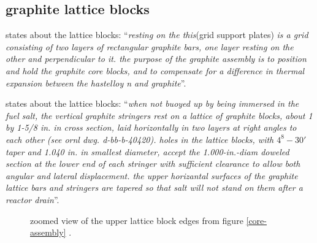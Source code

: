 \documentclass{article}
\begin{document}
\begin{preview}
\subsection{graphite lattice blocks}
\parencite[page 20]{ornl-tm-3229} states about the lattice blocks: \enquote{\textit{resting on the this}(grid support plates)\textit{ is a grid consisting of two layers of rectangular graphite bars, one layer resting on the other and perpendicular to it. the purpose of the graphite assembly is to position and hold the graphite core blocks, and to compensate for a difference in thermal expansion between the hastelloy n and graphite}}.

\parencite[page 79 and 81]{ornl-tm-0728} states about the lattice blocks: \enquote{\textit{when not buoyed up by being immersed in the fuel salt, the vertical graphite stringers rest on a lattice of graphite blocks, about 1 by 1-5/8 in. in cross section, laid horizontally in two layers at right angles to each other (see ornl dwg. d-bb-b-40420). holes in the lattice blocks, with $4^8-30'$ taper and 1.040 in. in smallest diameter, accept the 1.000-in.-diam doweled section at the lower end of each stringer with sufficient clearance to allow both angular and lateral displacement. the upper horizantal surfaces of the graphite lattice bars and stringers are tapered so that salt will not stand on them after a reactor drain}}.

\begin{figure}[H]
  \centering
  \caption{zoomed view of the upper lattice block edges from figure \ref{core-assembly} \parencite{ornl}.}
  \label{core-assembly-zoom}
\end{figure}


\end{preview}
\end{document}
